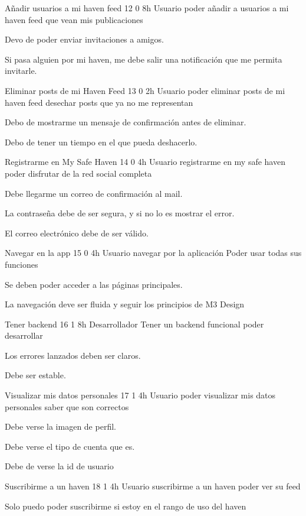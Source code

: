 \UserStory
{Añadir usuarios a mi haven feed}
{12}
{0}
{8h}
{Usuario}
{poder añadir a usuarios a mi haven feed}
{que vean mis publicaciones}
{
\item Devo de poder enviar invitaciones a amigos.
\item Si pasa alguien por mi haven, me debe salir una notificación que me permita invitarle.
}

\UserStory
{Eliminar posts de mi Haven Feed}
{13}
{0}
{2h}
{Usuario}
{poder eliminar posts de mi haven feed}
{desechar posts que ya no me representan}
{
\item Debo de mostrarme un mensaje de confirmación antes de eliminar.
\item Debo de tener un tiempo en el que pueda deshacerlo.
}

\UserStory
{Registrarme en My Safe Haven}
{14}
{0}
{4h}
{Usuario}
{registrarme en my safe haven}
{poder disfrutar de la red social completa}
{
\item Debe llegarme un correo de confirmación al mail.
\item La contraseña debe de ser segura, y si no lo es mostrar el error.
\item El correo electrónico debe de ser válido.
}

\UserStory
{Navegar en la app}
{15}
{0}
{4h}
{Usuario}
{navegar por la aplicación}
{Poder usar todas sus funciones}
{
\item Se deben poder acceder a las páginas principales.
\item La navegación deve ser fluida y seguir los principios de M3 Design
}

\TechStory
{Tener backend}
{16}
{1}
{8h}
{Desarrollador}
{Tener un backend funcional}
{poder desarrollar}
{
\item Los errores lanzados deben ser claros.
\item Debe ser estable.
}


\UserStory
{Visualizar mis datos personales}
{17}
{1}
{4h}
{Usuario}
{poder visualizar mis datos personales}
{saber que son correctos}
{
\item Debe verse la imagen de perfil.
\item Debe verse el tipo de cuenta que es.
\item Debe de verse la id de usuario
}

\UserStory
{Suscribirme a un haven}
{18}
{1}
{4h}
{Usuario}
{suscribirme a un haven}
{poder ver su feed}
{
\item Solo puedo poder suscribirme si estoy en el rango de uso del haven
}





